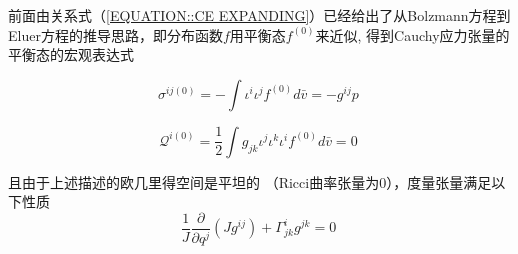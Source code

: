\documentclass[LBMDerivation.tex]{subfiles}
\begin{document}
前面由关系式（\ref{EQUATION::CE EXPANDING}）已经给出了从Bolzmann方程到Eluer方程的推导思路，即分布函数$f$用平衡态$f^{(0)}$来近似, 得到Cauchy应力张量的平衡态的宏观表达式

\begin{equation}
  \sigma^{ij(0)} =-\int \iota^{i} \iota^{j} f^{(0)}  d \bar{v}= -g^{ij} p
  \label{EQUATION::Cauchy应力张量1} ~
\end{equation}


\begin{equation}
  \mathcal{Q}^{i (0)} =\frac{1}{2}\int g_{jk} \iota^{j} \iota^{k}  \iota^{i} f^{(0)}  d \bar{v}= 0
  \label{EQUATION::heat flux} ~
\end{equation}





%
%




%
%
%
%

%
%

%
%

且由于上述描述的欧几里得空间是平坦的 （Ricci曲率张量为0），度量张量满足以下性质
\begin{equation}
  \frac{1}{J} \frac{\partial}{\partial q^{j}}\left(J g^{i j}\right)+\Gamma_{j k}^{i} g^{j k}=0
  \label{EQUATION::A.23} ~
\end{equation}
%
%
\end{document}
